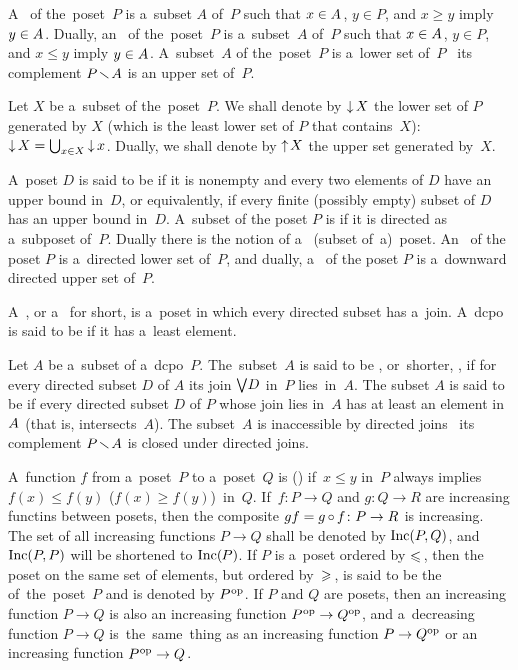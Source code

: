 \documentclass[11pt,letterpaper]{article}
\begin{document}
A~ of the~poset~$P$ is a~subset $A$ of~$P$
	such that $x\in A\mspace{1mu}$, $y\in P$, and $x\geq y$ imply $y\in A\mspace{1mu}$.
Dually, an~ of the~poset~$P$ is a~subset~$A$ of~$P$
	such that $x\in A\mspace{1mu}$, $y\in P$, and $x\leq y$ imply $y\in A\mspace{1mu}$.
A~subset~$A$ of the~poset~$P$ is a~lower set of~$P$
	\iff\ its complement $P\mspace{-2mu}\mathbin{\smallsetminus}\mspace{-2mu} A$ is an upper set of~$P$.

Let $X$ be a~subset of the~poset~$P$.
We shall denote by $\mathop{\smash{\downarrow}}\nolimits X$ the lower set of $P$ generated by $X$
	{\large(}which is the least lower set of $P$ that contains~$X${\large)}:
$\mathop{\smash{\downarrow}}\nolimits X = \mathop{\textstyle\bigcup}\nolimits_{x\in X} \mathop{\smash{\downarrow}}\nolimits x\mspace{1mu}$.
Dually, we shall denote by $\mathop{\smash{\uparrow}}\nolimits\mspace{-1mu} X$ the upper set generated by~$X$.

A~poset $D$ is said to be 
if it is nonempty and every two elements of $D$ have an upper bound in~$D$,
or equivalently, if every finite (possibly empty) subset of $D$ has an upper bound in~$D$.
A~subset of the poset $P$ is 
	if it is directed as a~subposet of~$P$.
Dually there is the notion of a~ (subset of~a)~poset.
An~ of the poset $P$ is a~directed lower set of~$P$,
and dually, a~ of the poset $P$ is a~downward directed upper set of~$P$.

\txtskip

A~, or a~ for short,
is a~poset in which every directed subset has a~join.
A~dcpo is said to be  if it has a~least element.

Let $A$ be a~subset of a~dcpo~$P$.
The~subset~$A$ is said to be ,
	or~shorter, ,
if for every directed subset $D$ of $A$ its join $\mathop{\textstyle\bigvee}\nolimits\!D$ in~$P$ lies~in~$A$.
The subset $A$ is said to be 
if every directed subset $D$ of $P$ whose join lies in~$A$
	has at least an element in~$A\mspace{1mu}$ (that is, intersects~$A$).
The subset~$A$ is inaccessible by directed joins \iff\
	its complement $P\mspace{-2mu}\mathbin{\smallsetminus}\mspace{-2mu} A$ is closed under directed joins.

\txtskip

A~function $f$ from a~poset~$P$ to a~poset~$Q$ is  ()
if~$x\leq y$ in~$P$ always implies $f(x)\leq f(y)$ {\large(}$f(x)\geq f(y)${\large)}~in~$Q$.
If~$f\colon P\to Q$ and $g\colon Q\to R$ are increasing functins between posets,
then the composite $gf = g\mspace{-1mu}\circ\mspace{-1mu} f\colon P\to R$ is increasing.
The set of all increasing functions $P\to Q$ shall be denoted by $\mathop{\smash{\mathrm{Inc}}}\nolimits(P,Q)$,
and $\mathop{\smash{\mathrm{Inc}}}\nolimits(P,P)$ will be shortened to $\mathop{\smash{\mathrm{Inc}}}\nolimits(\mspace{-1mu} P)$.
If $P$ is a~poset ordered by $\leqslant\mspace{2mu}$,
then the poset on the same set of elements, but ordered by~$\geqslant\mspace{2mu}$,
is said to be the \notion{opposite} %
	of~the~poset~$P$
and is denoted by $P^{\mspace{1mu}\mathrm{op}}$.
If $P$ and $Q$ are posets,
then an increasing function $P\to Q$ is also an increasing function $P^{\mspace{1mu}\mathrm{op}}\to Q^\mathrm{op}$,
and a~decreasing function $P\to Q$
is~the~same~thing as an increasing function $P\to Q^\mathrm{op}$
	or an increasing function $P^{\mspace{1mu}\mathrm{op}}\to Q\mspace{1mu}$.
\end{document}
